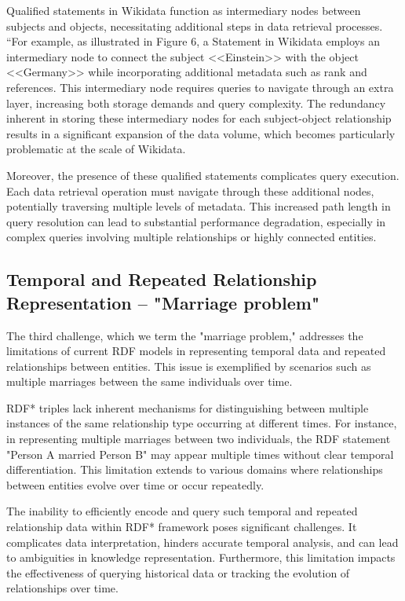 Qualified statements in Wikidata function as intermediary nodes between subjects and objects, necessitating additional steps in data retrieval processes. “For example, as illustrated in Figure 6, a Statement in Wikidata employs an intermediary node to connect the subject <<Einstein>> with the object <<Germany>> while incorporating additional metadata such as rank and references. This intermediary node requires queries to navigate through an extra layer, increasing both storage demands and query complexity. The redundancy inherent in storing these intermediary nodes for each subject-object relationship results in a significant expansion of the data volume, which becomes particularly problematic at the scale of Wikidata.

Moreover, the presence of these qualified statements complicates query execution. Each data retrieval operation must navigate through these additional nodes, potentially traversing multiple levels of metadata. This increased path length in query resolution can lead to substantial performance degradation, especially in complex queries involving multiple relationships or highly connected entities.

\subsection{Temporal and Repeated Relationship Representation – "Marriage problem"}

The third challenge, which we term the "marriage problem," addresses the limitations of current RDF models in representing temporal data and repeated relationships between entities. This issue is exemplified by scenarios such as multiple marriages between the same individuals over time.

RDF* triples lack inherent mechanisms for distinguishing between multiple instances of the same relationship type occurring at different times. For instance, in representing multiple marriages between two individuals, the RDF statement "Person A married Person B" may appear multiple times without clear temporal differentiation. This limitation extends to various domains where relationships between entities evolve over time or occur repeatedly.

The inability to efficiently encode and query such temporal and repeated relationship data within RDF* framework poses significant challenges. It complicates data interpretation, hinders accurate temporal analysis, and can lead to ambiguities in knowledge representation. Furthermore, this limitation impacts the effectiveness of querying historical data or tracking the evolution of relationships over time.

